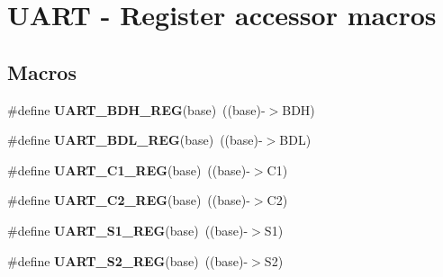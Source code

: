 \hypertarget{group__UART__Register__Accessor__Macros}{}\section{U\+A\+RT -\/ Register accessor macros}
\label{group__UART__Register__Accessor__Macros}
\subsection*{Macros}
\begin{DoxyCompactItemize}
\item 
\#define {\bfseries U\+A\+R\+T\+\_\+\+B\+D\+H\+\_\+\+R\+EG}(base)~((base)-\/$>$B\+DH)\hypertarget{group__UART__Register__Accessor__Macros_ga87a103f3d6a0d05f6b0c909cfeb7a4d9}{}\label{group__UART__Register__Accessor__Macros_ga87a103f3d6a0d05f6b0c909cfeb7a4d9}

\item 
\#define {\bfseries U\+A\+R\+T\+\_\+\+B\+D\+L\+\_\+\+R\+EG}(base)~((base)-\/$>$B\+DL)\hypertarget{group__UART__Register__Accessor__Macros_ga76a25b51a88219d40b957fed02d5e196}{}\label{group__UART__Register__Accessor__Macros_ga76a25b51a88219d40b957fed02d5e196}

\item 
\#define {\bfseries U\+A\+R\+T\+\_\+\+C1\+\_\+\+R\+EG}(base)~((base)-\/$>$C1)\hypertarget{group__UART__Register__Accessor__Macros_ga10f9aabe3d0f670422c5342bebc3f3e2}{}\label{group__UART__Register__Accessor__Macros_ga10f9aabe3d0f670422c5342bebc3f3e2}

\item 
\#define {\bfseries U\+A\+R\+T\+\_\+\+C2\+\_\+\+R\+EG}(base)~((base)-\/$>$C2)\hypertarget{group__UART__Register__Accessor__Macros_ga3ef76a47d3674e17ffcbf0bfb4ac2680}{}\label{group__UART__Register__Accessor__Macros_ga3ef76a47d3674e17ffcbf0bfb4ac2680}

\item 
\#define {\bfseries U\+A\+R\+T\+\_\+\+S1\+\_\+\+R\+EG}(base)~((base)-\/$>$S1)\hypertarget{group__UART__Register__Accessor__Macros_ga5ff0eec7fa7a282423d94fc39f143624}{}\label{group__UART__Register__Accessor__Macros_ga5ff0eec7fa7a282423d94fc39f143624}

\item 
\#define {\bfseries U\+A\+R\+T\+\_\+\+S2\+\_\+\+R\+EG}(base)~((base)-\/$>$S2)\hypertarget{group__UART__Register__Accessor__Macros_ga0e7d1c8dce2636260ce4ca1c63d622db}{}\label{group__UART__Register__Accessor__Macros_ga0e7d1c8dce2636260ce4ca1c63d622db}


\end{DoxyCompactItemize}
